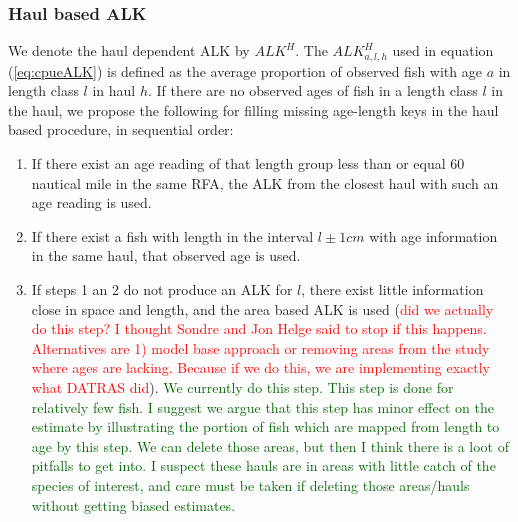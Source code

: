 \documentclass[a4paper 12pt]{article}
\numberwithin{equation}{section}
\newcommand{\ed}[1]{\textcolor{red}{#1}}
\newcommand{\olav}[1]{\textcolor{darkgreen}{#1}}
\begin{document}
\subsubsection{Haul based ALK}
\label{sec:haulestimator}
We denote the haul dependent ALK  by  $ALK^{H}$. The $ALK^{H}_{a,l,h}$  used in equation (\ref{eq:cpueALK}) is defined as the average proportion of observed fish with age $a$ in  length class $l$ in haul $h$. If there are no observed ages of fish in a length class $l$ in the haul, we propose the following for filling missing age-length keys in the  haul based procedure, in sequential order:
\begin{enumerate}
\item If there exist an age reading of that length group less than or equal 60 nautical mile in the same RFA, the ALK from the closest haul with such an age reading is used.
\item If there exist a fish with length in the interval $l\pm 1cm$ with age information in the same haul, that observed age is used.  
\item If steps 1 an 2 do not produce an ALK for $l$, there exist little information close in space and length, and the area based ALK is used (\ed{did we actually do this step? I thought Sondre and Jon Helge said to stop if this happens. Alternatives are 1) model base approach or removing areas from the study where ages are lacking. Because if we do this, we are implementing exactly what DATRAS did}). \olav{We currently do this step. This step is done for relatively few fish. I suggest we argue that this step has minor effect on the estimate by illustrating the portion of fish which are mapped from length to age by this step. We can delete those areas, but then I think there is a loot of pitfalls to get into. I suspect these hauls are in areas with little catch of the species of interest, and care must be taken if deleting those areas/hauls without getting biased estimates.}
\end{enumerate}
\end{document}
